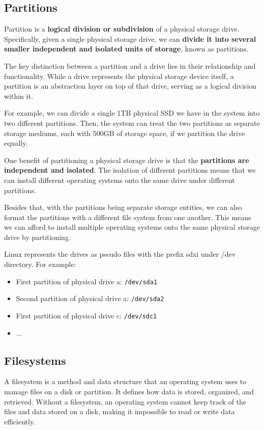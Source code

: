 \documentclass{article}
\begin{document}
\subsection{Partitions}
Partition is a \textbf{logical division or subdivision} of a physical storage drive. Specifically, given a single physical storage drive, we can \textbf{divide it into several smaller independent and isolated units of storage}, known as partitions.

The key distinction between a partition and a drive lies in their relationship and functionality. While a drive represents the physical storage device itself, a partition is an abstraction layer on top of that drive, serving as a logical division within it.

For example, we can divide a single 1TB physical SSD we have in the system into two different partitions. Then, the system can treat the two partitions as separate storage mediums, each with 500GB of storage space, if we partition the drive equally.

One benefit of partitioning a physical storage drive is that the \textbf{partitions are independent and isolated}. The isolation of different partitions means that we can install different operating systems onto the same drive under different partitions.

Besides that, with the partitions being separate storage entities, we can also format the partitions with a different file system from one another. This means we can afford to install multiple operating systems onto the same physical storage drive by partitioning.

Linux represents the drives as pseudo files with the prefix sdxi under /dev directory. For example:
\begin{itemize}
    \item First partition of physical drive a: \verb|/dev/sda1|
    \item Second partition of physical drive a: \verb|/dev/sda2|
    \item First partition of physical drive c: \verb|/dev/sdc1|
    \item ...
\end{itemize}

\subsection{Filesystems}
A filesystem is a method and data structure that an operating system uses to manage files on a disk or partition. It defines how data is stored, organized, and retrieved. Without a filesystem, an operating system cannot keep track of the files and data stored on a disk, making it impossible to read or write data efficiently.
\end{document}
